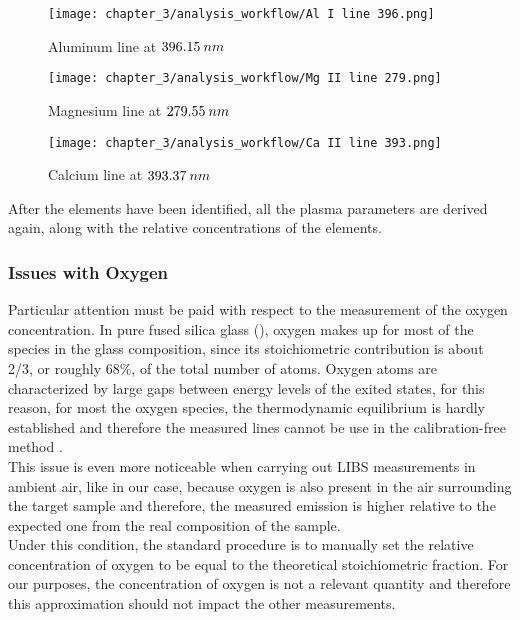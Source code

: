 \begin{figure}[H]
    \centering
    \texttt{[image: chapter\_3/analysis\_workflow/Al I line 396.png]} 
    \caption{Aluminum line at $\protect 396.15 \:nm$}
    \label{fig:aluminum_line_lte}
\end{figure}
\begin{figure}[H]
    \centering
    \texttt{[image: chapter\_3/analysis\_workflow/Mg II line 279.png]} 
    \caption{Magnesium line at $\protect 279.55 \:nm$ }
    \label{fig:magnesium_line_lte}
\end{figure}
\begin{figure}[H]
    \centering
    \texttt{[image: chapter\_3/analysis\_workflow/Ca II line 393.png]} 
    \caption{Calcium line at $\protect 393.37 \:nm$ }
    \label{fig:calcium_line_lte}
\end{figure}

After the elements have been identified, all the plasma parameters are derived again, along with the relative concentrations of the elements. 

\subsubsection{Issues with Oxygen}
\label{subsubsec:oxygen_issues}

Particular attention must be paid with respect to the measurement of the oxygen concentration. In pure fused silica glass (), oxygen makes up for most of the species in the glass composition, since its stoichiometric contribution is about 2/3, or roughly 68\%, of the total number of atoms. Oxygen atoms are characterized by large gaps between energy levels of the exited states, for this reason, for most the oxygen species, the thermodynamic equilibrium is hardly established and therefore the measured lines cannot be use in the calibration-free method \cite{tognoniCalibrationFreeLaserInducedBreakdown2010}.
\\
This issue is even more noticeable when carrying out LIBS measurements in ambient air, like in our case, because oxygen is also present in the air surrounding the target sample and therefore, the measured emission is higher relative to the expected one from the real composition of the sample. 
\\
Under this condition, the standard procedure is to manually set the relative concentration of oxygen to be equal to the theoretical stoichiometric fraction. For our purposes, the concentration of oxygen is not a relevant quantity and therefore this approximation should not impact the other measurements.




